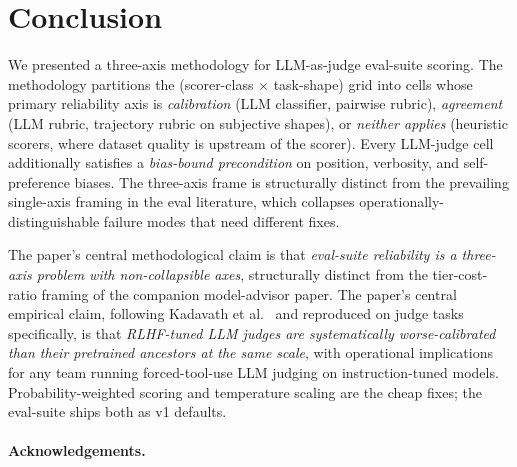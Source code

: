 \section{Conclusion}
\label{sec:conclusion}


\noindent We presented a three-axis methodology for LLM-as-judge eval-suite
scoring. The methodology partitions the (scorer-class $\times$
task-shape) grid into cells whose primary reliability axis is
\emph{calibration} (LLM classifier, pairwise rubric), \emph{agreement}
(LLM rubric, trajectory rubric on subjective shapes), or \emph{neither
applies} (heuristic scorers, where dataset quality is upstream of the
scorer). Every LLM-judge cell additionally satisfies a \emph{bias-bound
precondition} on position, verbosity, and self-preference biases. The
three-axis frame is structurally distinct from the prevailing
single-axis framing in the eval literature, which collapses
operationally-distinguishable failure modes that need different fixes.

\noindent The paper's central methodological claim is that
\emph{eval-suite reliability is a three-axis problem with non-collapsible
axes}, structurally distinct from the tier-cost-ratio framing of the
companion model-advisor paper. The paper's central empirical claim,
following Kadavath et al.\ \cite{kadavath2022language} and reproduced
on judge tasks specifically, is that \emph{RLHF-tuned LLM judges are
systematically worse-calibrated than their pretrained ancestors at
the same scale}, with operational implications for any team running
forced-tool-use LLM judging on instruction-tuned models. Probability-weighted
scoring \cite{liu2023geval} and temperature scaling
\cite{guo2017calibration} are the cheap fixes; the eval-suite ships
both as v1 defaults.

\paragraph{Acknowledgements.}
